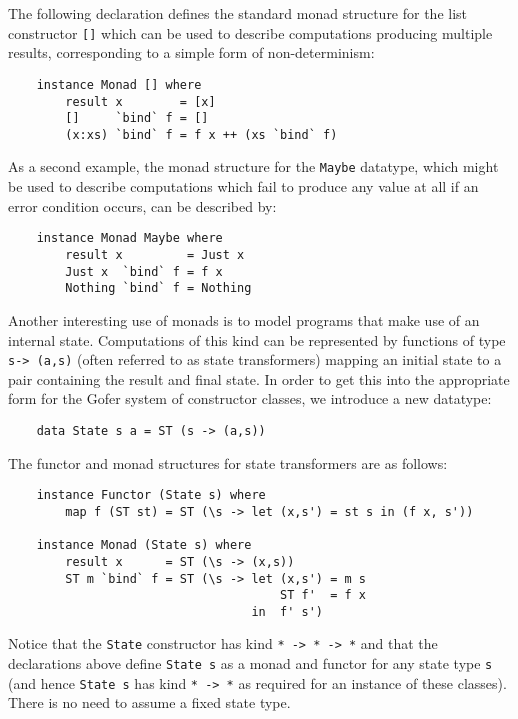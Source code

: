 The following declaration defines the standard monad structure for the
list constructor \verb"[]" which can be used to describe computations
producing multiple results, corresponding to a simple form of
non-determinism:
\begin{verbatim}
    instance Monad [] where
        result x        = [x]
        []     `bind` f = []
        (x:xs) `bind` f = f x ++ (xs `bind` f)
\end{verbatim}
As a second example, the monad structure for the \verb"Maybe" datatype, which
might be used to describe computations which fail to produce any value
at all if an error condition occurs, can be described by:
\begin{verbatim}
    instance Monad Maybe where
        result x         = Just x
        Just x  `bind` f = f x
        Nothing `bind` f = Nothing
\end{verbatim}
Another interesting use of monads is to model programs that make use of
an internal state.  Computations of this kind can be represented by
functions of type \verb"s-> (a,s)" (often referred to as state transformers)
mapping an initial state to a pair containing the result and final
state.  In order to get this into the appropriate form for the Gofer
system of constructor classes, we introduce a new datatype:
\begin{verbatim}
    data State s a = ST (s -> (a,s))
\end{verbatim}
The functor and monad structures for state transformers are as follows:
\begin{verbatim}
    instance Functor (State s) where
        map f (ST st) = ST (\s -> let (x,s') = st s in (f x, s'))

    instance Monad (State s) where
        result x      = ST (\s -> (x,s))
        ST m `bind` f = ST (\s -> let (x,s') = m s
                                      ST f'  = f x
                                  in  f' s')
\end{verbatim}
Notice that the \verb"State" constructor has kind \verb"* -> * -> *" and that the
declarations above define \verb"State s" as a monad and functor for any state
type \verb"s" (and hence \verb"State s" has kind \verb"* -> *" as required for an instance
of these classes).  There is no need to assume a fixed state type.


